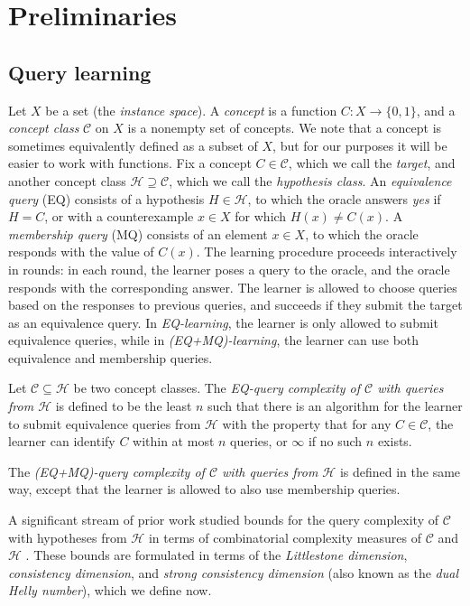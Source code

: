 \documentclass[runningheads]{llncs}
\newcommand{\mc}{\mathcal}
\begin{document}
\section{Preliminaries} \label{section:preliminaries}

\subsection{Query learning}

Let $X$ be a set (the \emph{instance space}). 
A \emph{concept} is a function $C : X \to \{0,1\}$, and a \emph{concept class} $\mc C$ on $X$ is a nonempty set of concepts. 
We note that a concept is sometimes equivalently defined as a subset of $X$, but for our purposes it will be easier to work with functions. 
Fix a concept $C \in \mc C$, which we call the \textit{target}, and another concept class $\mc H \supseteq \mc C$, which we call the \emph{hypothesis class}. 
An \emph{equivalence query} (EQ) consists of a hypothesis $H \in \mc H$, to which the oracle answers \textit{yes} if $H = C$, or with a counterexample $x \in X$ for which $H(x) \neq C(x)$. 
A \emph{membership query} (MQ) consists of an element $x \in X$, to which the oracle responds with the value of $C(x)$. 
The learning procedure proceeds interactively in rounds: in each round, the learner poses a query to the oracle, and the oracle responds with the corresponding answer. 
The learner is allowed to choose queries based on the responses to previous queries, and succeeds if they submit the target as an equivalence query. 
In \emph{EQ-learning}, the learner is only allowed to submit equivalence queries, while in \emph{(EQ+MQ)-learning}, the learner can use both equivalence and membership queries. 

\begin{definition}
    Let $\mc C \subseteq \mc H$ be two concept classes. 
    The \emph{EQ-query complexity of $\mc C$ with queries from $\mc H$} is defined to be the least $n$ such that there is an algorithm for the learner to submit equivalence queries from $\mc H$ with the property that for any $C \in \mc C$, the learner can identify $C$ within at most $n$ queries, or $\infty$ if no such $n$ exists.
    
    The \emph{(EQ+MQ)-query complexity of $\mc C$ with queries from $\mc H$} is defined in the same way, except that the learner is allowed to also use membership queries.
\end{definition}

A significant stream of prior work studied bounds for the query complexity of $\mc C$ with hypotheses from $\mc H$ in terms of combinatorial complexity measures of $\mc C$ and $\mc H$ \cite{hellerstein-pillaipakkamnatt-raghavan-wilkins:how-many-queries-are-needed-to-learn,balcazar-castro-guijarro-simon:consistency-dimension-query-learning,chase-freitag:bounds-in-query-learning,hanneke-livni-moran:online-learning-simple-predictors}.
These bounds are formulated in terms of the \emph{Littlestone dimension}, \emph{consistency dimension}, and \emph{strong consistency dimension} (also known as the \emph{dual Helly number}), which we define now.
\end{document}
